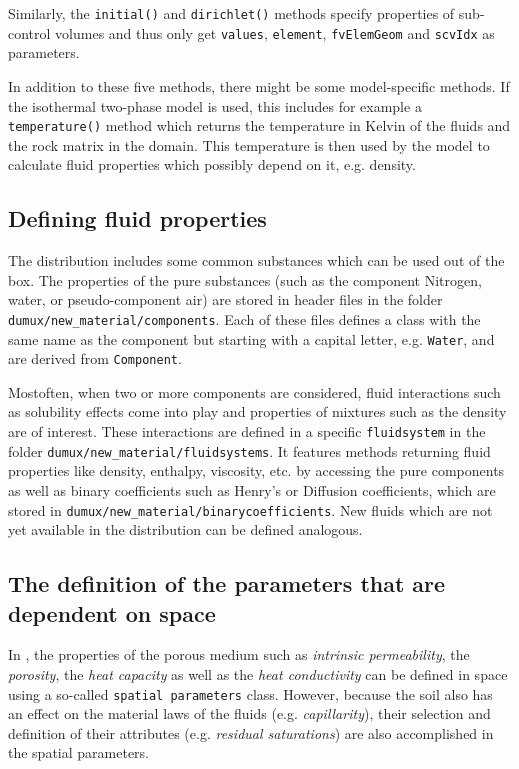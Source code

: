 Similarly, the \texttt{initial()} and \texttt{dirichlet()} methods
specify properties of sub-control volumes and thus only get
\texttt{values}, \texttt{element}, \texttt{fvElemGeom} and
\texttt{scvIdx} as parameters.

In addition to these five methods, there might be some model-specific
methods. If the isothermal two-phase model is used, this includes 
for example a \texttt{temperature()} method which returns the temperature in Kelvin
of the fluids and the rock matrix in the domain. This temperature is
then used by the model to calculate fluid properties which possibly
depend on it, e.g. density.


\subsection{Defining fluid properties}\label{tutorial-coupled:description-fluid-class}

The \Dumux distribution includes some common substances which can be used
out of the box. The properties of the pure substances (such as the component 
Nitrogen, water, or pseudo-component air) are stored in header files in 
the folder \verb+dumux/new_material/components+. Each of these files 
defines a class with the same name as the component but starting with a capital
letter, e.g. \texttt{Water}, and are derived from \texttt{Component}.

Mostoften, when two or more components are considered, fluid interactions 
such as solubility effects come into play and properties of mixtures such as 
the density are of interest. These interactions are defined in
a specific \verb+fluidsystem+ in the folder \verb+dumux/new_material/fluidsystems+.
It features methods returning fluid properties like density, enthalpy, viscosity,
etc. by accessing the pure components as well as binary coefficients such as
Henry's or Diffusion coefficients, which are stored in 
\verb+dumux/new_material/binarycoefficients+. New fluids which are not yet
 available in the \Dumux distribution can be defined analogous.

\subsection{The definition of the parameters that are dependent on space}\label{tutorial-coupled:description-spatialParameters}

In \Dumux, the properties of the porous medium such as \textit{intrinsic 
permeability}, the \textit{porosity}, the \textit{heat capacity} as
well as the \textit{heat conductivity} can be defined in space using a
so-called \texttt{spatial parameters} class.  However, because the soil
also has an effect on the material laws of the fluids (e.g. \textit{capillarity}),
their selection and definition of their attributes (e.g. \textit{residual 
saturations}) are also accomplished in the spatial parameters.

